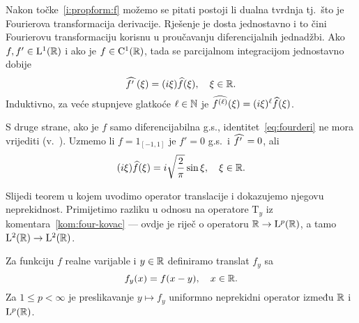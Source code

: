 \documentclass[main.tex]{subfiles}
\begin{document}
\begin{komentar}\label{kom:four-deri}
	\newcommand{\fourderi}[1]{\wh{{#1}^{\prime\phantom{.}}  }}
	Nakon točke~\ref{i:propform:f} možemo se pitati postoji li dualna tvrdnja
	tj.\ što je Fourierova transformacija derivacije. Rješenje je dosta
	jednostavno i to čini Fourierovu transformaciju korisnu u proučavanju
	diferencijalnih jednadžbi. Ako \( f,f' \in \mathrm{L}^1(\mathbb{R}) \) i ako je \( f \in \mathrm C^1(\mathbb{R} )\),
	tada se parcijalnom integracijom jednostavno dobije
	\begin{equation}\label{eq:fourderi}
		\fourderi f (\xi) = (i\xi)\wh f(\xi), \quad \xi \in \R.
	\end{equation}
	Induktivno, za veće stupnjeve glatkoće \( \ell \in \mathbb{N} \)
	je \( \widehat{f^{(\ell)}}(\xi) = (i\xi)^\ell \widehat{f}(\xi)  \).

	S druge strane, ako je \( f \) samo diferencijabilna g.s., identitet~\eqref{eq:fourderi}
	ne mora vrijediti (v.~\cite[exercise~9.6]{rudin}). Uzmemo li \( f=1_{[-1,1]} \)
	je \( f'=0 \) g.s.\ i \( \fourderi f = 0 \), ali
	\begin{equation}
		(i\xi)\widehat{f}(\xi) = i\sqrt{\frac 2\pi} \sin \xi, \quad \xi \in \mathbb{R}.
	\end{equation}
\end{komentar}

Slijedi teorem u kojem uvodimo
operator translacije i dokazujemo njegovu neprekidnost.
Primijetimo razliku u odnosu na operatore \( \mathrm T_y \)
iz komentara~\ref{kom:four-kovac} --- ovdje je riječ o operatoru \( \mathbb{R} \to \mathrm{L}^p(\mathbb{R}) \),
a tamo \( \mathrm{L}^2(\mathbb{R}) \to \mathrm{L}^2(\mathbb{R}) \).

\begin{teorem}\label{tm:trans}
	Za funkciju \( f \) realne varijable i \( y \in \mathbb{R} \) definiramo
	translat \( f_y \) sa
	\begin{equation}
		f_y(x) = f(x-y), \quad x \in \mathbb{R}.
	\end{equation}
	Za  \( 1 \le p < \infty \) je preslikavanje \( y \mapsto f_y \)
	uniformno neprekidni operator između \( \mathbb{R} \) i \( \mathrm{L}^p(\mathbb{R}) \).
\end{teorem}
\end{document}

